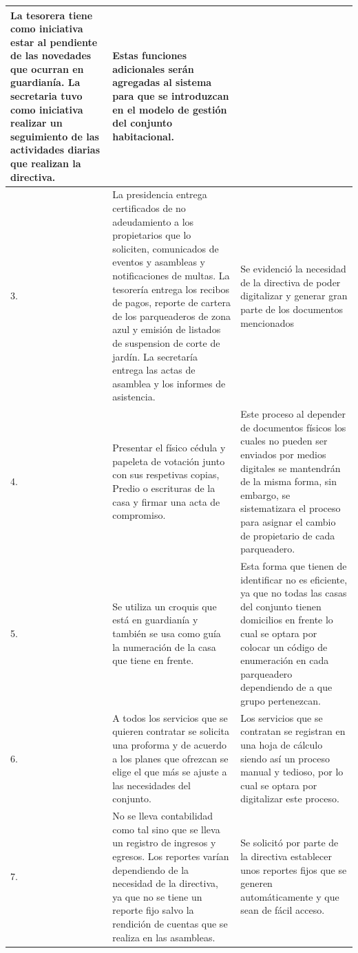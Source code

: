 \begin{center}
\begin{small}
\begin{longtable}[c]{|p{} |p{} |p{}|}
        La tesorera tiene como iniciativa estar al pendiente de las novedades que ocurran en guardianía.
       La secretaria tuvo como iniciativa realizar un seguimiento de las actividades diarias que realizan la directiva.
       & Estas funciones adicionales serán agregadas al sistema para que se introduzcan en el modelo de gestión del conjunto habitacional.\\
        \hline
        3. & La presidencia entrega certificados de no adeudamiento a los propietarios que lo soliciten, comunicados de eventos y asambleas y notificaciones de multas.
        La tesorería entrega los recibos de pagos, reporte de cartera de los parqueaderos de zona azul y emisión de listados de suspension de corte de jardín.
       La secretaría entrega las actas de asamblea y los informes de asistencia.
        & Se evidenció la necesidad de la directiva de poder digitalizar y generar gran parte de los documentos mencionados\\
        \hline
        4. & Presentar el físico cédula y papeleta de votación junto con sus respetivas copias, Predio o escrituras de la casa y firmar una acta de compromiso.
        & Este proceso al depender de documentos físicos los cuales no pueden ser enviados por medios digitales se mantendrán de la misma forma, sin embargo, se sistematizara el proceso para asignar el cambio de propietario de cada parqueadero.\\
        \hline
        5. & Se utiliza un croquis que está en guardianía y también se usa como guía la numeración de la casa que tiene en frente.
        & Esta forma que tienen de identificar no es eficiente, ya que no todas las casas del conjunto tienen domicilios en frente lo cual se optara por colocar un código de enumeración en cada parqueadero dependiendo de a que grupo pertenezcan.\\
        \hline
        6. & A todos los servicios que se quieren contratar se solicita una proforma y de acuerdo a los planes que ofrezcan se elige el que más se ajuste a las necesidades del conjunto.
        & Los servicios que se contratan se registran en una hoja de cálculo siendo así un proceso manual y tedioso, por lo cual se optara por digitalizar este proceso.\\
        \hline
        7. & No se lleva contabilidad como tal sino que se lleva un registro de ingresos y egresos.
        Los reportes varían dependiendo de la necesidad de la directiva, ya que no se tiene un reporte fijo salvo la rendición de cuentas que se realiza en las asambleas.
        & Se solicitó por parte de la directiva establecer unos reportes fijos que se generen automáticamente y que sean de fácil acceso.\\

\end{longtable}
\end{small}
\end{center}
